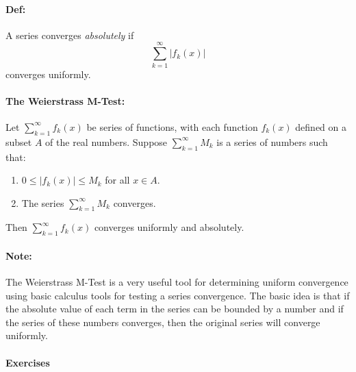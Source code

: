 \documentclass[10pt,a4paper]{article}
\begin{document}
\paragraph{Def:} A series converges \textit{absolutely} if 
$$ \sum_{k=1}^\infty |f_k(x)|$$
converges uniformly.

\paragraph{The Weierstrass M-Test:} Let $\sum_{k=1}^\infty f_k(x)$ be series of functions, with each function $f_k(x)$ defined on a subset $A$ of the real numbers. Suppose $\sum_{k=1}^\infty M_k$ is a series of numbers such that:
\begin{enumerate}
\item $0 \leq |f_k(x)| \leq M_k$ for all $x \in A$.
\item The series $\sum_{k=1}^\infty M_k$ converges.
\end{enumerate} 
Then $\sum_{k=1}^\infty f_k(x)$ converges uniformly and absolutely.

\paragraph{Note:} The Weierstrass M-Test is a very useful tool for determining uniform convergence using basic calculus tools for testing a series convergence. The basic idea is that if the absolute value of each term in the series can be bounded by a number and if the series of these numbers converges, then the original series will converge uniformly. 

\paragraph{Exercises}
\end{document}

